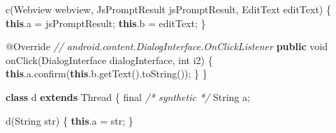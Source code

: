 \documentclass[
]{article}
\newenvironment{Shaded}{}{}
\newcommand{\AttributeTok}[1]{\textcolor[rgb]{0.49,0.56,0.16}{#1}}
\newcommand{\BuiltInTok}[1]{\textcolor[rgb]{0.00,0.50,0.00}{#1}}
\newcommand{\CommentTok}[1]{\textcolor[rgb]{0.38,0.63,0.69}{\textit{#1}}}
\newcommand{\DataTypeTok}[1]{\textcolor[rgb]{0.56,0.13,0.00}{#1}}
\newcommand{\FunctionTok}[1]{\textcolor[rgb]{0.02,0.16,0.49}{#1}}
\newcommand{\KeywordTok}[1]{\textcolor[rgb]{0.00,0.44,0.13}{\textbf{#1}}}
\newcommand{\NormalTok}[1]{#1}
\newcommand{\OperatorTok}[1]{\textcolor[rgb]{0.40,0.40,0.40}{#1}}
\begin{document}
\begin{Shaded}
\begin{Highlighting}[]
        \FunctionTok{c}\OperatorTok{(}\NormalTok{Webview webview}\OperatorTok{,}\NormalTok{ JsPromptResult jsPromptResult}\OperatorTok{,}\NormalTok{ EditText editText}\OperatorTok{)} \OperatorTok{\{}
            \KeywordTok{this}\OperatorTok{.}\FunctionTok{a} \OperatorTok{=}\NormalTok{ jsPromptResult}\OperatorTok{;}
            \KeywordTok{this}\OperatorTok{.}\FunctionTok{b} \OperatorTok{=}\NormalTok{ editText}\OperatorTok{;}
        \OperatorTok{\}}

        \AttributeTok{@Override} \CommentTok{// android.content.DialogInterface.OnClickListener}
        \KeywordTok{public} \DataTypeTok{void} \FunctionTok{onClick}\OperatorTok{(}\NormalTok{DialogInterface dialogInterface}\OperatorTok{,} \DataTypeTok{int}\NormalTok{ i2}\OperatorTok{)} \OperatorTok{\{}
            \KeywordTok{this}\OperatorTok{.}\FunctionTok{a}\OperatorTok{.}\FunctionTok{confirm}\OperatorTok{(}\KeywordTok{this}\OperatorTok{.}\FunctionTok{b}\OperatorTok{.}\FunctionTok{getText}\OperatorTok{().}\FunctionTok{toString}\OperatorTok{());}
        \OperatorTok{\}}
    \OperatorTok{\}}

    \KeywordTok{class}\NormalTok{ d }\KeywordTok{extends} \BuiltInTok{Thread} \OperatorTok{\{}
        \DataTypeTok{final} \CommentTok{/* synthetic */} \BuiltInTok{String}\NormalTok{ a}\OperatorTok{;}

        \FunctionTok{d}\OperatorTok{(}\BuiltInTok{String}\NormalTok{ str}\OperatorTok{)} \OperatorTok{\{}
            \KeywordTok{this}\OperatorTok{.}\FunctionTok{a} \OperatorTok{=}\NormalTok{ str}\OperatorTok{;}
        \OperatorTok{\}}


\end{Highlighting}
\end{Shaded}
\end{document}
